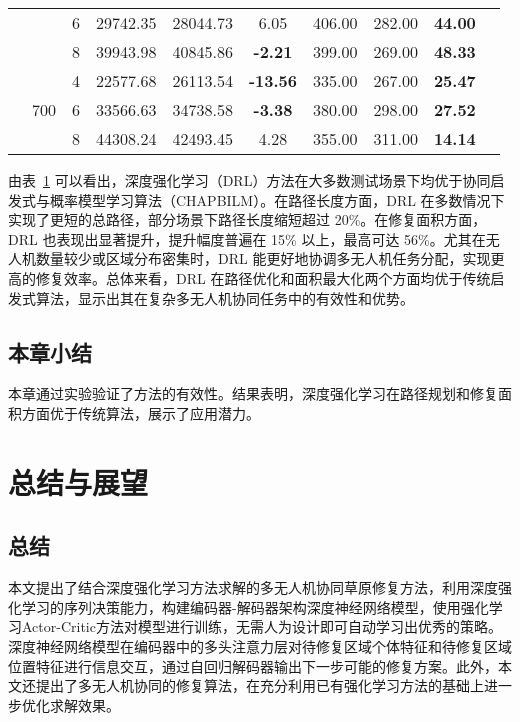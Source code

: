 \documentclass[AutoFakeBold]{LZUThesis}
\begin{document}
\begin{table}[H]
\begin{tabular}{ccc cccc ccc}
		 & & 6 & 29742.35 & 28044.73 & 6.05           & 406.00 & 282.00 & \textbf{44.00} \\
		 & & 8 & 39943.98 & 40845.86 & \textbf{-2.21} & 399.00 & 269.00 & \textbf{48.33} \\
		\cmidrule(lr){2-9}
		 & \multirow{3}{*}{700} 
		   & 4 & 22577.68 & 26113.54 & \textbf{-13.56} & 335.00 & 267.00 & \textbf{25.47} \\
		 & & 6 & 33566.63 & 34738.58 & \textbf{-3.38} & 380.00 & 298.00 & \textbf{27.52} \\
		 & & 8 & 44308.24 & 42493.45 & 4.28           & 355.00 & 311.00 & \textbf{14.14} \\
		\bottomrule
	\end{tabular}
	\label{tab:combined_comparison}
\end{table}

由表~\ref{tab:combined_comparison} 可以看出，深度强化学习（DRL）方法在大多数测试场景下均优于协同启发式与概率模型学习算法（CHAPBILM）。在路径长度方面，DRL 在多数情况下实现了更短的总路径，部分场景下路径长度缩短超过 20\%。在修复面积方面，DRL 也表现出显著提升，提升幅度普遍在 15\% 以上，最高可达 56\%。尤其在无人机数量较少或区域分布密集时，DRL 能更好地协调多无人机任务分配，实现更高的修复效率。总体来看，DRL 在路径优化和面积最大化两个方面均优于传统启发式算法，显示出其在复杂多无人机协同任务中的有效性和优势。


\section{本章小结}
本章通过实验验证了方法的有效性。结果表明，深度强化学习在路径规划和修复面积方面优于传统算法，展示了应用潜力。

\chapter{总结与展望}

\section{总结}
本文提出了结合深度强化学习方法求解的多无人机协同草原修复方法，利用深度强化学习的序列决策能力，构建编码器-解码器架构深度神经网络模型，使用强化学习Actor-Critic方法对模型进行训练，无需人为设计即可自动学习出优秀的策略。深度神经网络模型在编码器中的多头注意力层对待修复区域个体特征和待修复区域位置特征进行信息交互，通过自回归解码器输出下一步可能的修复方案。此外，本文还提出了多无人机协同的修复算法，在充分利用已有强化学习方法的基础上进一步优化求解效果。
\end{document}
